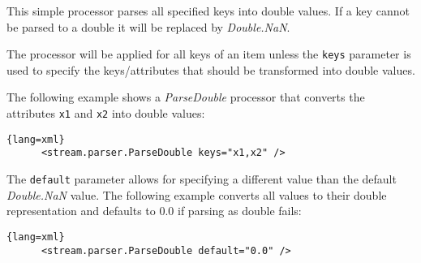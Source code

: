 
This simple processor parses all specified keys into double values. If a
key cannot be parsed to a double it will be replaced by
\emph{Double.NaN}.

The processor will be applied for all keys of an item unless the
\texttt{keys} parameter is used to specify the keys/attributes that
should be transformed into double values.

The following example shows a \emph{ParseDouble} processor that converts
the attributes \texttt{x1} and \texttt{x2} into double values:

\begin{lstlisting}{lang=xml}
      <stream.parser.ParseDouble keys="x1,x2" />
\end{lstlisting}

The \texttt{default} parameter allows for specifying a different value
than the default \emph{Double.NaN} value. The following example converts
all values to their double representation and defaults to 0.0 if parsing
as double fails:

\begin{lstlisting}{lang=xml}
      <stream.parser.ParseDouble default="0.0" />
\end{lstlisting}


\begin{table}[h]
\end{table}
